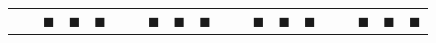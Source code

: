 \documentclass[a4paper,11pt]{article}
\begin{document}
\begin{center}
\begin{tabular}{r|c|c|c|c|r|c|c|c|c|r|c|c|c|c|r|c|c|c|c|}
\multicolumn{1}{c}{} & \multicolumn{1}{c}{} & \multicolumn{1}{c}{$\blacksquare$} & \multicolumn{1}{c}{$\blacksquare$} & \multicolumn{1}{c}{$\blacksquare$} & \multicolumn{1}{c}{} & \multicolumn{1}{c}{} & \multicolumn{1}{c}{$\blacksquare$} & \multicolumn{1}{c}{$\blacksquare$} & \multicolumn{1}{c}{$\blacksquare$} & \multicolumn{1}{c}{} & \multicolumn{1}{c}{} & \multicolumn{1}{c}{$\blacksquare$} & \multicolumn{1}{c}{$\blacksquare$} & \multicolumn{1}{c}{$\blacksquare$} & \multicolumn{1}{c}{} & \multicolumn{1}{c}{} & \multicolumn{1}{c}{$\blacksquare$} & \multicolumn{1}{c}{$\blacksquare$} & \multicolumn{1}{c}{$\blacksquare$}\\ 
\end{tabular}
\end{center}
\end{document}
